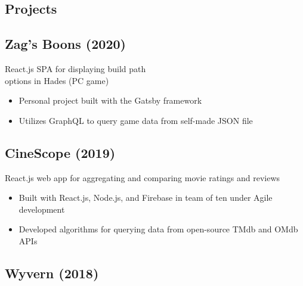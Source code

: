\documentclass{article}
\begin{document}
\setlength{\columnsep}{1.5cm} 		%
\setlength{\columnseprule}{0.2pt} 	%
\begin{paracol}{2} 			%

\vspace{-2.5em}
\section{Projects}

\vspace{-0.5em}
\subsection{Zag's Boons (2020)} \hfill \vspace{0.2em}

{\color{NavyBlue} React.js SPA for displaying build path 
\\\indent options in Hades (PC game)}
\begin{itemize}[leftmargin=*]
	\itemsep0em 
	\item Personal project built with the Gatsby framework
	\item Utilizes GraphQL to query game data from self-made JSON file
\end{itemize}

\vspace{-0.5em}
\subsection{CineScope (2019)} \hfill \vspace{0.2em}

{\color{NavyBlue} React.js web app for aggregating and comparing 
\indent movie ratings and reviews}
\begin{itemize}[leftmargin=*]
	\itemsep0em 
	\item Built with React.js, Node.js, and Firebase in team of ten under Agile development
	\item Developed algorithms for querying data from open-source TMdb and OMdb APIs
\end{itemize}

\vspace{-0.5em}
\subsection{Wyvern (2018)} \hfill \vspace{0.2em}


\end{paracol}
\end{document}

